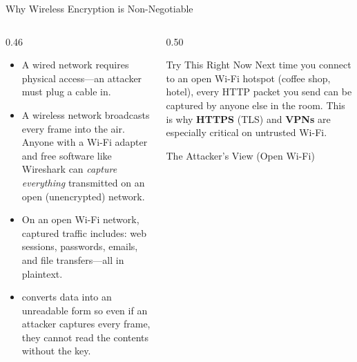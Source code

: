 \documentclass[aspectratio=169]{beamer}
\begin{document}
\begin{frame}{Why Wireless Encryption is Non-Negotiable}
    \begin{columns}[T]
        \begin{column}{0.46\textwidth}
            \footnotesize
            \begin{itemize}
                \item A wired network requires physical access---an attacker must plug a cable in.
                \item A wireless network broadcasts every frame into the air. Anyone with a Wi-Fi adapter and free software like Wireshark can \emph{capture everything} transmitted on an open (unencrypted) network.
                \item On an open Wi-Fi network, captured traffic includes: web sessions, passwords, emails, and file transfers---all in plaintext.
                \item {} converts data into an unreadable form so even if an attacker captures every frame, they cannot read the contents without the key.
            \end{itemize}
        \end{column}
        \begin{column}{0.50\textwidth}
            \begin{alertblock}{Try This Right Now}
                \footnotesize
                Next time you connect to an open Wi-Fi hotspot (coffee shop, hotel), every HTTP packet you send can be captured by anyone else in the room. This is why \textbf{HTTPS} (TLS) and \textbf{VPNs} are especially critical on untrusted Wi-Fi.
            \end{alertblock}
            \vspace{0.3em}
            \begin{block}{The Attacker's View (Open Wi-Fi)}
                \begin{center}
                \end{center}
            \end{block}
        \end{column}
    \end{columns}
\end{frame}
\end{document}

